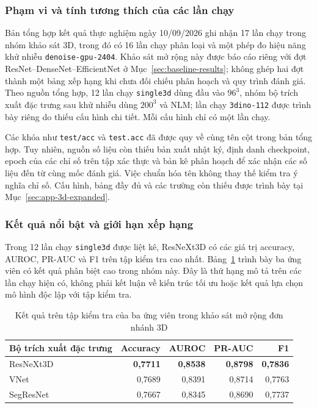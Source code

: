 \documentclass[14pt,a4paper,oneside]{extreport}
\begin{document}
\subsubsection{Phạm vi và tính tương thích của các lần chạy}
Bản tổng hợp kết quả thực nghiệm ngày 10/09/2026 ghi nhận 17 lần chạy
trong nhóm khảo sát 3D, trong đó có 16 lần chạy phân loại và một phép đo hiệu năng
khử nhiễu \texttt{denoise-gpu-2404}. Khảo sát mở rộng này được báo cáo
riêng với đợt ResNet--DenseNet--EfficientNet ở
Mục~\ref{sec:baseline-results}; không ghép hai đợt thành một bảng xếp hạng
khi chưa đối chiếu phân hoạch và quy trình đánh giá.
Theo nguồn tổng hợp, 12 lần chạy \texttt{single3d} dùng đầu vào $96^3$,
nhóm bộ trích xuất đặc trưng sau khử nhiễu dùng $200^3$ và NLM; lần chạy \texttt{3dino-112}
được trình bày riêng do thiếu cấu hình chi tiết. Mỗi cấu hình chỉ có một lần chạy.

Các khóa như \texttt{test/acc} và \texttt{test.acc} đã được quy về cùng
tên cột trong bản tổng hợp. Tuy nhiên, nguồn số liệu còn thiếu bản xuất nhật ký, định danh
checkpoint, epoch của các chỉ số trên tập xác thực và bản kê phân hoạch
để xác nhận các số liệu đến từ cùng mốc đánh giá. Việc chuẩn hóa tên
không thay thế kiểm tra ý nghĩa chỉ số. Cấu hình, bảng đầy đủ và các
trường còn thiếu được trình bày tại Mục~\ref{sec:app-3d-expanded}.

\subsubsection{Kết quả nổi bật và giới hạn xếp hạng}
Trong 12 lần chạy \texttt{single3d} được liệt kê, ResNeXt3D có các giá trị
accuracy, AUROC, PR-AUC và F1 trên tập kiểm tra cao nhất. Bảng~\ref{tab:sweep-3d-leading}
trình bày ba ứng viên có kết quả phân biệt cao trong nhóm này.
Đây là thứ hạng mô tả trên các lần chạy hiện có, không phải kết luận về
kiến trúc tối ưu hoặc kết quả lựa chọn mô hình độc lập với tập kiểm tra.

\begin{table}[htbp]
  \centering
  \caption{Kết quả trên tập kiểm tra của ba ứng viên trong khảo sát mở rộng đơn nhánh 3D}
  \label{tab:sweep-3d-leading}
  \setlength{\tabcolsep}{6pt}
  \begin{tabular}{@{}lrrrr@{}}
    \toprule
    Bộ trích xuất đặc trưng & Accuracy & AUROC & PR-AUC & F1\\ \midrule
    ResNeXt3D & \textbf{0,7711} & \textbf{0,8538} & \textbf{0,8798} & \textbf{0,7836}\\
    VNet & 0,7689 & 0,8391 & 0,8714 & 0,7763\\
    SegResNet & 0,7667 & 0,8345 & 0,8690 & 0,7737\\
    \bottomrule
  \end{tabular}
  \par{}
\end{table}
\end{document}
